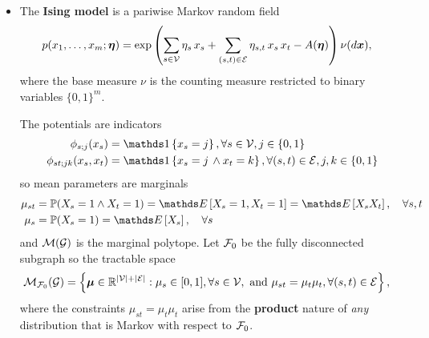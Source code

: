 \documentclass[11pt]{article}
\begin{document}
\begin{itemize}
\item The \textbf{Ising model} is a pariwise Markov random field
\begin{align}
p(x_1, \ldots, x_m; \boldsymbol{\eta}) &= \exp\left(\sum_{s\in {\mathcal V}}\eta_s\,x_s + \sum_{(s,t) \in {\mathcal E}}\eta_{s,t}\,x_s\,x_t - A(\boldsymbol{\eta})\right)\nu(d\boldsymbol{x}), \label{eqn: ising_model}
\end{align} where the base measure $\nu$ is the counting measure restricted to binary variables $\{0,1\}^m.$ 

The potentials are indicators
\begin{align*}
\phi_{s;j}(x_s) &= \ind{x_s = j}, \forall s\in \cV, j  \in \set{0,1}\\
\phi_{st;jk}(x_s, x_t) &= \ind{x_s = j \, \land x_{t} = k}, \forall (s,t) \in \cE, j,k \in \set{0,1} 
\end{align*} so mean parameters are marginals
\begin{align*}
\mu_{st} &=  \bP(X_s =1 \land X_t = 1)= \E{}{X_{s}=1, X_{t} = 1} = \E{}{X_{s}X_{t}} , \quad \forall s,t \\
\mu_{s} &= \bP(X_s = 1 ) = \E{}{X_{s}},  \quad \forall s
\end{align*} and ${\mathcal M}({\mathcal G})$ is the marginal polytope.  Let ${\mathcal F}_{0}$ be the fully disconnected subgraph so the tractable space
\begin{align}
{\mathcal M}_{{\mathcal F}_{0}}({\mathcal G}) &= \left\{\boldsymbol{\mu} \in {\mathbb R}^{|{\mathcal V}| + |{\mathcal E}|}:  \mu_{s} \in [0,1], \forall s\in {\mathcal V}, \text{ and } \mu_{st}=\mu_{t}\mu_{t}, \forall (s,t) \in {\mathcal E} \right\},  \label{eqn: mean_field_ising_model_constraint}
\end{align} where the constraints $ \mu_{st}=\mu_{t}\mu_{t}$ arise from the \textbf{product} nature of \emph{any} distribution that is Markov with respect to ${\mathcal F}_0$.


\end{itemize}
\end{document}
